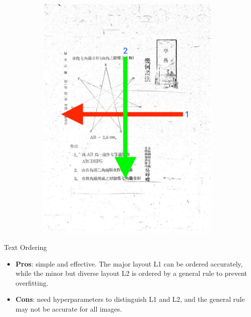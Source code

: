 \documentclass{beamer}
\begin{document}
\begin{frame}
\begin{figure}
        \begin{subfigure}[b]{0.3\linewidth}
            \includegraphics[height=1.3\linewidth]{./figures/fnzz3_order.jpeg}
        \end{subfigure}
    \end{figure}
\end{frame}

\begin{frame}
    \begin{center}
        \Large{Text Ordering}
    \end{center}
    \begin{itemize}
        \item \textbf{Pros}: simple and effective. The major layout L1 can be ordered accurately, while the minor but diverse layout L2 is ordered by a general rule to prevent overfitting.
        \item \textbf{Cons}: need hyperparameters to distinguish L1 and L2, and the general rule may not be accurate for all images.
    \end{itemize}
\end{frame}
\end{document}
